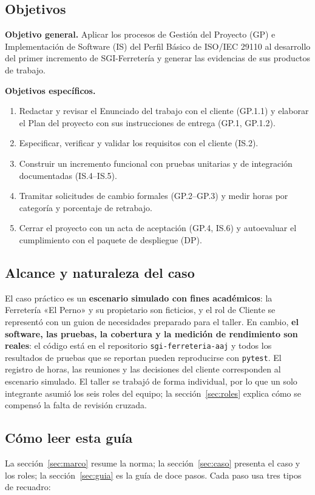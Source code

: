 \documentclass[11pt,a4paper]{article}
\newcommand{\cod}[1]{\texttt{\small #1}}
\begin{document}
\subsection{Objetivos}
\textbf{Objetivo general.} Aplicar los procesos de Gestión del Proyecto (GP) e Implementación de Software (IS) del Perfil Básico de ISO/IEC 29110 al desarrollo del primer incremento de SGI-Ferretería y generar las evidencias de sus productos de trabajo.

\noindent\textbf{Objetivos específicos.}
\begin{enumerate}
  \item Redactar y revisar el Enunciado del trabajo con el cliente (GP.1.1) y elaborar el Plan del proyecto con sus instrucciones de entrega (GP.1, GP.1.2).
  \item Especificar, verificar y validar los requisitos con el cliente (IS.2).
  \item Construir un incremento funcional con pruebas unitarias y de integración documentadas (IS.4–IS.5).
  \item Tramitar solicitudes de cambio formales (GP.2–GP.3) y medir horas por categoría y porcentaje de retrabajo.
  \item Cerrar el proyecto con un acta de aceptación (GP.4, IS.6) y autoevaluar el cumplimiento con el paquete de despliegue (DP).
\end{enumerate}

\subsection{Alcance y naturaleza del caso}
El caso práctico es un \textbf{escenario simulado con fines académicos}: la Ferretería «El Perno» y su propietario son ficticios, y el rol de Cliente se representó con un guion de necesidades preparado para el taller. En cambio, \textbf{el software, las pruebas, la cobertura y la medición de rendimiento son reales}: el código está en el repositorio \cod{sgi-ferreteria-aaj} y todos los resultados de pruebas que se reportan pueden reproducirse con \cod{pytest}. El registro de horas, las reuniones y las decisiones del cliente corresponden al escenario simulado. El taller se trabajó de forma individual, por lo que un solo integrante asumió los seis roles del equipo; la sección~\ref{sec:roles} explica cómo se compensó la falta de revisión cruzada.

\subsection{Cómo leer esta guía}
La sección~\ref{sec:marco} resume la norma; la sección~\ref{sec:caso} presenta el caso y los roles; la sección~\ref{sec:guia} es la guía de doce pasos. Cada paso usa tres tipos de recuadro:
\end{document}
